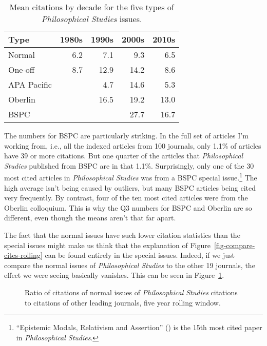 \documentclass[
  10pt,
  letterpaper,
  DIV=11,
  numbers=noendperiod,
  twoside]{scrartcl}
\begin{document}
\begin{longtable}[]{@{}lrrrr@{}}

\caption{\label{tbl-citation-by-type-decade}Mean citations by decade for
the five types of \emph{Philosophical Studies} issues.}

\tabularnewline

\toprule\noalign{}
Type & 1980s & 1990s & 2000s & 2010s \\
\midrule\noalign{}
\endhead
\bottomrule\noalign{}
\endlastfoot
Normal & 6.2 & 7.1 & 9.3 & 6.5 \\
One-off & 8.7 & 12.9 & 14.2 & 8.6 \\
APA Pacific & & 4.7 & 14.6 & 5.3 \\
Oberlin & & 16.5 & 19.2 & 13.0 \\
BSPC & & & 27.7 & 16.7 \\

\end{longtable}

The numbers for BSPC are particularly striking. In the full set of
articles I'm working from, i.e., all the indexed articles from 100
journals, only 1.1\% of articles have 39 or more citations. But one
quarter of the articles that \emph{Philosophical Studies} published from
BSPC are in that 1.1\%. Surprisingly, only one of the 30 most cited
articles in \emph{Philosophical Studies} was from a BSPC special
issue.\footnote{``Epistemic Modals, Relativism and Assertion''
  () is the 15th most cited
  paper in \emph{Philosophical Studies}.} The high average isn't being
caused by outliers, but many BSPC articles being cited very frequently.
By contrast, four of the ten most cited articles were from the Oberlin
colloquium. This is why the Q3 numbers for BSPC and Oberlin are so
different, even though the means aren't that far apart.

The fact that the normal issues have such lower citation statistics than
the special issues might make us think that the explanation of
Figure~\ref{fig-compare-cites-rolling} can be found entirely in the
special issues. Indeed, if we just compare the normal issues of
\emph{Philosophical Studies} to the other 19 journals, the effect we
were seeing basically vanishes. This can be seen in
Figure~\ref{fig-means-normal-only}.

\begin{figure}


\caption{\label{fig-means-normal-only}Ratio of citations of normal
issues of \emph{Philosophical Studies} citations to citations of other
leading journals, five year rolling window.}

\end{figure}%
\end{document}
